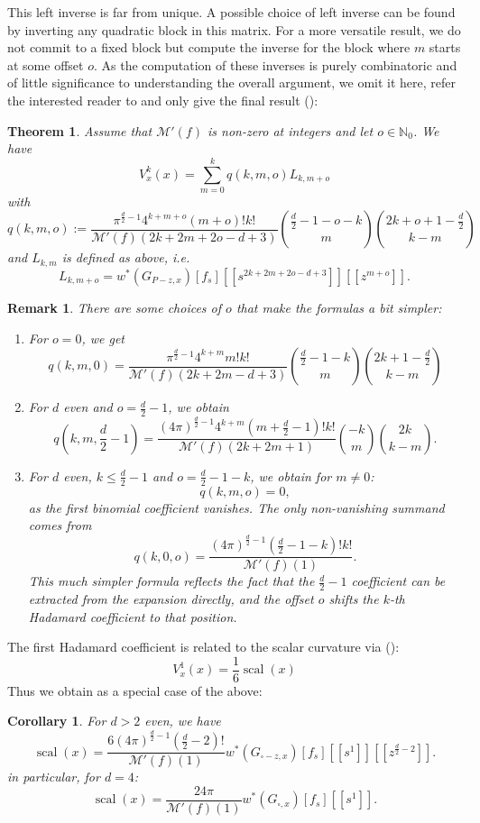 \documentclass[11pt]{article}
\def\N{{\mathbb{N}}}
\def\M{\mathcal{M}}
\newtheorem{thm}[df]{Theorem}
\newtheorem{cor}[df]{Corollary}
\newtheorem{rem}[df]{Remark}
\DeclareMathOperator{\scal}{scal}
\begin{document}
This left inverse is far from unique. A possible choice of left inverse can be found by inverting any quadratic block in this matrix. For a more versatile result, we do not commit to a fixed block but compute the inverse for the block where $m$ starts at some offset $o$. As the computation of these inverses is purely combinatoric and of little significance to understanding the overall argument, we omit it here, refer the interested reader to \cite[Section 5.2]{Ron} and only give the final result (\cite[Theorem 5.2.12]{Ron}):
\begin{thm}
	\label{main}
	Assume that $\M'(f)$ is non-zero at integers and let $o\in \N_0$.
	We have
	\[V^k_x(x)=\sum\limits_{m=0}^k q(k,m,o)L_{k,m+o}\]
	with 
	\[q(k,m,o):=\frac{\pi^{\frac{d}{2}-1}4^{k+m+o}(m+o)!k!}{\M'(f)({2k+2m+2o-d+3})}\binom{\frac{d}{2}-1-o-k}{m}\binom{2k+o+1-\frac{d}{2}}{k-m}\]
	and $L_{k,m}$ is defined as above, i.e.
	\[L_{k,m+o}=w^*(G_{P-z,x})[f_s][[s^{2k+2m+2o-d+3}]][[z^{m+o}]].\]
\end{thm}
\begin{rem}
	\label{qsipm}
	There are some choices of $o$ that make the formulas a bit simpler:
	\begin{enumerate}
		\item For $o=0$, we get
			\[q(k,m,0)=\frac{\pi^{\frac{d}{2}-1}4^{k+m}m!k!}{\M'(f)({2k+2m-d+3})}\binom{\frac{d}{2}-1-k}{m}\binom{2k+1-\frac{d}{2}}{k-m}\]
		\item For $d$ even and $o=\frac{d}{2}-1$, we obtain
			\[q(k,m,\frac{d}{2}-1)=\frac{(4\pi)^{\frac{d}{2}-1}4^{k+m}(m+\frac{d}{2}-1)!k!}{\M'(f)({2k+2m+1})}\binom{-k}{m}\binom{2k}{k-m}.\]
		\item For $d$ even, $k\leq \frac{d}{2}-1$ and $o=\frac{d}{2}-1-k$, we obtain for $m\neq 0$:
		\[q(k,m,o)=0,\]
		as the first binomial coefficient vanishes.
		The only non-vanishing summand comes from
		\[q(k,0,o)=\frac{(4\pi)^{\frac{d}{2}-1}(\frac{d}{2}-1-k)!k!}{\M'(f)({1})}.\]
		This much simpler formula reflects the fact that the $\frac{d}{2}-1$ coefficient can be extracted from the expansion directly, and the offset $o$ shifts the $k$-th Hadamard coefficient to that position.
	\end{enumerate}	
\end{rem}
	The first Hadamard coefficient is related to the scalar curvature via (\cite[before 2.3.2]{BGP}):
	\[V^1_x(x)=\frac{1}{6}\scal(x)\]
	Thus we obtain as a special case of the above:
	\begin{cor}
		For $d>2$ even, we have
		\[\scal(x)=\frac{6(4\pi)^{\frac{d}{2}-1}(\frac{d}{2}-2)!}{\M'(f)({1})}w^*(G_{\square-z,x})[f_s][[s^{1}]][[z^{\frac{d}{2}-2}]].\]
		in particular, for $d=4$:
		\[\scal(x)=\frac{24\pi}{\M'(f)({1})}w^*(G_{\square,x})[f_s][[s^{1}]].\]
	\end{cor}
\end{document}
